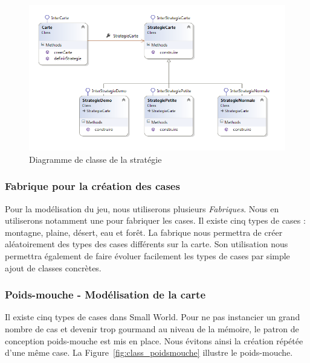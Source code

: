 \documentclass[a4paper]{article}%
\begin{document}
\begin{figure}[H]
    \centering
    \includegraphics[width=\textwidth]{./images/classe/strategie.png}
		\caption{Diagramme de classe de la stratégie}
		\label{fig:class_strategie}
\end{figure}

\subsubsection{Fabrique pour la création des cases}
Pour la modélisation du jeu, nous utiliserons plusieurs \textit{Fabriques}. 
Nous en utiliserons notamment une pour fabriquer les cases. Il existe cinq types de cases : montagne, plaine, désert, eau et forêt.
La fabrique nous permettra de créer aléatoirement des types des cases différents sur la carte.
Son utilisation nous permettra également de faire évoluer facilement les types de cases par simple ajout de classes concrètes.


\subsubsection{Poids-mouche - Modélisation de la carte}

Il existe cinq types de cases dans Small World. Pour ne pas instancier un grand nombre de cas et devenir trop gourmand au niveau de la mémoire, le patron de conception poids-mouche est mis en place. Nous évitons ainsi la création répétée d'une même case. La Figure~\ref{fig:class_poidsmouche} illustre le poids-mouche.
\end{document}
